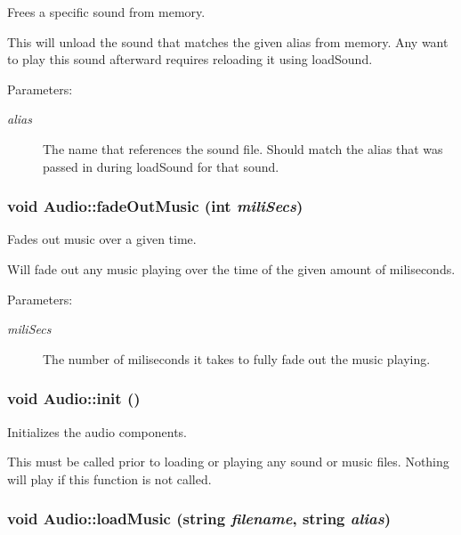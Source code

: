 Frees a specific sound from memory. 

This will unload the sound that matches the given alias from memory. Any want to play this sound afterward requires reloading it using loadSound. \begin{Desc}
\item[Parameters:]
\begin{description}
\item[{\em alias}]The name that references the sound file. Should match the alias that was passed in during loadSound for that sound. \end{description}
\end{Desc}
\hypertarget{class_audio_3dd19311958192e1099d06dcb471e45e}{
\subsubsection[{fadeOutMusic}]{\setlength{\rightskip}{0pt plus 5cm}void Audio::fadeOutMusic (int {\em miliSecs})}}
\label{class_audio_3dd19311958192e1099d06dcb471e45e}


Fades out music over a given time. 

Will fade out any music playing over the time of the given amount of miliseconds. \begin{Desc}
\item[Parameters:]
\begin{description}
\item[{\em miliSecs}]The number of miliseconds it takes to fully fade out the music playing. \end{description}
\end{Desc}
\hypertarget{class_audio_bd850ac47b52b4e43dfcbbc627162728}{
\subsubsection[{init}]{\setlength{\rightskip}{0pt plus 5cm}void Audio::init ()}}
\label{class_audio_bd850ac47b52b4e43dfcbbc627162728}


Initializes the audio components. 

This must be called prior to loading or playing any sound or music files. Nothing will play if this function is not called. \hypertarget{class_audio_3189dc36941d6049a6f106d9b9682bf8}{
\subsubsection[{loadMusic}]{\setlength{\rightskip}{0pt plus 5cm}void Audio::loadMusic (string {\em filename}, \/  string {\em alias})}}
\label{class_audio_3189dc36941d6049a6f106d9b9682bf8}


